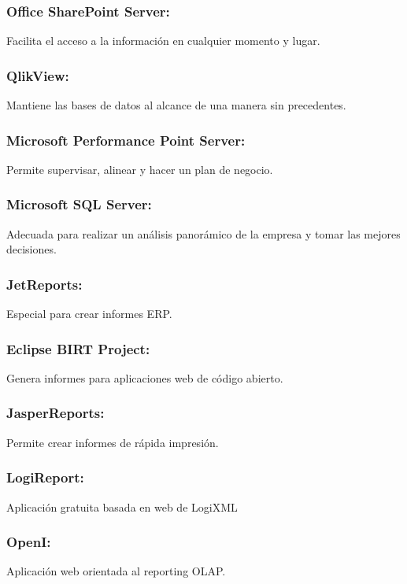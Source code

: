 \subsubsection{Office SharePoint Server: }\label{sec:nada2}  
Facilita el acceso a la información en cualquier momento y lugar.

\subsubsection{QlikView: }\label{sec:nada2}  
Mantiene las bases de datos al alcance de una manera sin precedentes.

\subsubsection{Microsoft Performance Point Server: }\label{sec:nada2}  
Permite supervisar, alinear y hacer un plan de negocio.

\subsubsection{Microsoft SQL Server: }\label{sec:nada2}  
Adecuada para realizar un análisis panorámico de la empresa y tomar las mejores decisiones.

\subsubsection{JetReports: }\label{sec:nada2}  
Especial para crear informes ERP.

\subsubsection{Eclipse BIRT Project: }\label{sec:nada2}  
Genera informes para aplicaciones web de código abierto.

\subsubsection{JasperReports: }\label{sec:nada2}  
Permite crear informes de rápida impresión.

\subsubsection{LogiReport: }\label{sec:nada2}  
Aplicación gratuita basada en web de LogiXML

\subsubsection{OpenI: }\label{sec:nada2} 
Aplicación web orientada al reporting OLAP.

